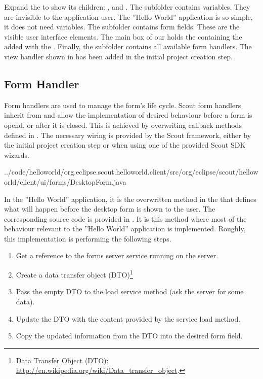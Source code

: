 \documentclass[a4paper,10pt,twoside]{book}
\begin{document}
Expand the  to show its children: ,  and .
The  subfolder contains variables. They are invisible to the application user.
The ''Hello World'' application is so simple, it does not need variables.
The subfolder  contains form fields. These are the visible user interface elements.
The main box of our  holds the  containing the  added with the .
Finally, the  subfolder contains all available form handlers.
The view handler shown in  has been added in the initial project creation step.

\subsection{Form Handler}

Form handlers are used to manage the form's life cycle.
Scout form handlers inherit from  and allow the implementation of desired behaviour before a form is opend, or after it is closed.
This is achieved by overwriting callback methods defined in .
The necessary wiring is provided by the Scout framework, either by the initial project creation step or when using one of the provided Scout SDK wizards.


{../code/helloworld/org.eclipse.scout.helloworld.client/src/org/eclipse/scout/helloworld/client/ui/forms/DesktopForm.java}

In the ''Hello World'' application, it is the overwritten  method in the  that defines what will happen before the desktop form is shown to the user.
The corresponding source code is provided in .
It is this  method where most of the behaviour relevant to the ''Hello World'' application is implemented.
Roughly, this implementation is performing the following steps.

\begin{enumerate}
  \item Get a reference to the forms server service running on the server.
  \item Create a data transfer object (DTO)\footnote{
Data Transfer Object (DTO): \url{http://en.wikipedia.org/wiki/Data_transfer_object}.}
  \item Pass the empty DTO to the load service method (ask the server for some data).
  \item Update the DTO with the content provided by the service load method.
  \item Copy the updated information from the DTO into the desired form field.
\end{enumerate}
\end{document}
